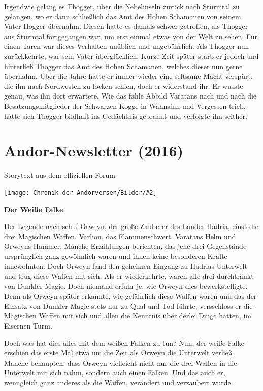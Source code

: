 \documentclass[10pt, a4paper, oneside]{book}
\newcommand{\fillbreak}{\vspace*{\fill}\columnbreak}
\newcommand{\storytext}[1]{%
    \section{#1}%
    \label{Storytext: #1}%
}
\newcommand{\bildmitts}[2][height=0.32\textwidth,width=0.48\textwidth,keepaspectratio]{%
    \begin{center}
        \texttt{[image: Chronik der Andorversen/Bilder/\#2]}
    \end{center}
}
\begin{document}
\begin{multicols}{2}
Irgendwie gelang es Thogger, über die Nebelinseln zurück nach Sturmtal zu gelangen, wo er dann schließlich das Amt des Hohen Schamanen von seinem Vater Hogger übernahm. Diesen hatte es damals schwer getroffen, als Thogger aus Sturmtal fortgegangen war, um erst einmal etwas von der Welt zu sehen. Für einen Taren war dieses Verhalten unüblich und ungebührlich. Als Thogger nun zurückkehrte, war sein Vater überglücklich. Kurze Zeit später starb er jedoch und hinterließ Thogger das Amt des Hohen Schamanen, welches dieser nun gerne übernahm. Über die Jahre hatte er immer wieder eine seltsame Macht verspürt, die ihn nach Nordwesten zu locken schien, doch er widerstand ihr. Er wusste genau, was ihn dort erwartete. Wie das fahle Abbild Varatans nach und nach die Besatzungsmitglieder der Schwarzen Kogge in Wahnsinn und Vergessen trieb, hatte sich Thogger bildhaft ins Gedächtnis gebrannt und verfolgte ihn seither.


\fillbreak
\storytext{Andor-Newsletter (2016)}

\begin{center}
    Storytext aus dem offiziellen Forum
\end{center}

\bildmitts{Der Andor Newsletter (2016).jpeg}

\textbf{Der Weiße Falke}\bigskip

Der Legende nach schuf Orweyn, der große Zauberer des Landes Hadria, einst die drei Magischen Waffen. Varlion, das Flammenschwert, Varatans Helm und Orweyns Hammer. Manche Erzählungen berichten, das jene drei Gegenstände ursprünglich ganz gewöhnlich waren und ihnen keine besonderen Kräfte innewohnten. Doch Orweyn fand den geheimen Eingang zu Hadrias Unterwelt und trug diese Waffen mit sich. Als er wiederkehrte, waren alle drei durchtränkt von Dunkler Magie. Doch niemand erfuhr je, wie Orweyn dies bewerkstelligte. Denn als Orweyn später erkannte, wie gefährlich diese Waffen waren und das der Einsatz von Dunkler Magie stets nur zu Qual und Tod führte, versschloss er die Magischen Waffen mit sich und allen die Kenntnis über derlei Dinge hatten, im Eisernen Turm.

Doch was hat dies alles mit dem weißen Falken zu tun? Nun, der weiße Falke erschien das erste Mal etwa um die Zeit als Orweyn die Unterwelt verließ. Manche behaupten, dass Orweyn vielleicht nicht nur die drei Waffen in die Unterwelt mit sich nahm, sondern auch einen Falken. Und das auch er, wenngleich ganz anderes als die Waffen, verändert und verzaubert wurde.\bigskip


\end{multicols}
\end{document}
